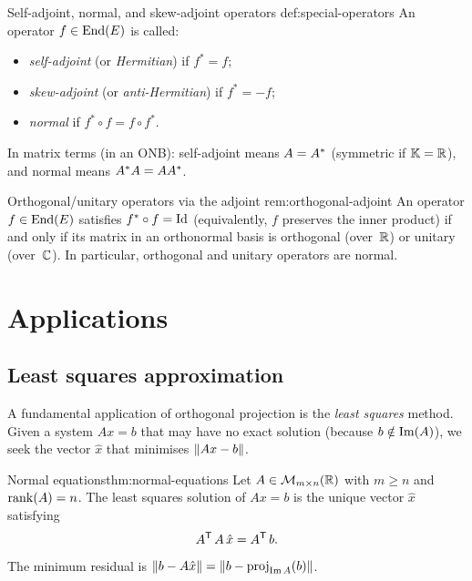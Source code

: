 \begin{definition}{Self-adjoint, normal, and skew-adjoint operators}%
{def:special-operators}
An operator $f\in\operatorname{End}(E)$ is called:
\begin{itemize}
  \item \emph{self-adjoint} (or \emph{Hermitian})
    if $f^* = f$;
  \item \emph{skew-adjoint} (or \emph{anti-Hermitian}) if $f^* = -f$;
  \item \emph{normal} if $f^*\circ f = f\circ f^*$.
\end{itemize}
In matrix terms (in an ONB): self-adjoint means $A = {A}^{*}$
(symmetric if ${\mathbb{K}} = {\mathbb{R}}$), and normal means ${A}^{*}A = A{A}^{*}$.
\end{definition}

\begin{remark}{Orthogonal/unitary operators via the adjoint}%
{rem:orthogonal-adjoint}
An operator $f\in\operatorname{End}(E)$ satisfies $f^*\circ f = \operatorname{Id}$ (equivalently,
$f$ preserves the inner product) if and only if its matrix in an
orthonormal basis is orthogonal (over~${\mathbb{R}}$) or unitary (over~${\mathbb{C}}$).
In particular, orthogonal and unitary operators are normal.
\end{remark}


\section{Applications}\label{sec:inner-product-applications}


\subsection{Least squares approximation}\label{subsec:least-squares}

A fundamental application of orthogonal projection is the \emph{least
squares} method.  Given a system $Ax = b$ that may have no exact
solution (because $b\notin\operatorname{Im}(A)$), we seek the vector $\hat{x}$ that
minimises $\lVert Ax - b\rVert$.

\begin{theorem}{Normal equations}{thm:normal-equations}
Let $A\in\mathcal{M}_{m\times n}({\mathbb{R}})$ with $m\geq n$ and $\operatorname{rank}(A) = n$.
The least squares solution of $Ax = b$ is the unique vector $\hat{x}$
satisfying
\[
  {A}^{\mathsf{T}}\, A\, \hat{x} = {A}^{\mathsf{T}}\, b.
\]
The minimum residual is $\lVert b - A\hat{x}\rVert = \lVert b - \operatorname{proj}_{\operatorname{Im} A}(b)\rVert$.
\end{theorem}


